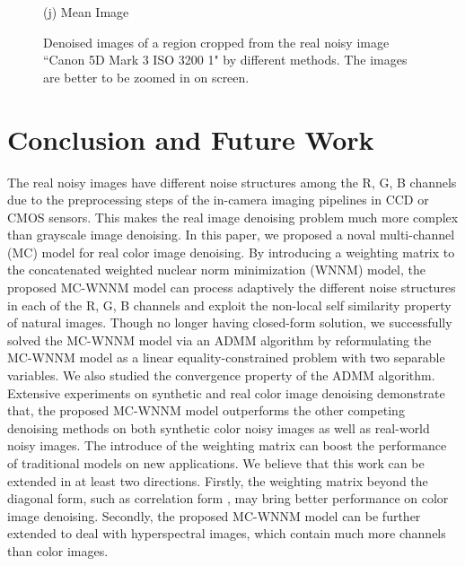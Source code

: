 \documentclass[10pt,twocolumn,letterpaper,sort&compress]{article}
\begin{document}
\begin{figure}
{\begin{minipage}[t]{0.195\textwidth}
{\footnotesize (j) Mean Image \cite{crosschannel2016}}
\end{minipage}
}\vspace{-0.5mm}
\caption{Denoised images of a region cropped from the real noisy image ``Canon 5D Mark 3 ISO 3200 1" \cite{crosschannel2016} by different methods. The images are better to be zoomed in on screen.}
\label{f5}
\vspace{0.5mm}
\end{figure}

\section{Conclusion and Future Work}

The real noisy images have different noise structures among the R, G, B channels due to the preprocessing steps of the in-camera imaging pipelines in CCD or CMOS sensors. This makes the real image denoising problem much more complex than grayscale image denoising. In this paper, we proposed a noval multi-channel (MC) model for real color image denoising. By introducing a weighting matrix to the concatenated weighted nuclear norm minimization (WNNM) model, the proposed MC-WNNM model can process adaptively the different noise structures in each of the R, G, B channels and exploit the non-local self similarity property of natural images. Though no longer having closed-form solution, we successfully solved the MC-WNNM model via an ADMM algorithm by reformulating the MC-WNNM model as a linear equality-constrained problem with two separable variables. We also studied the convergence property of the ADMM algorithm. Extensive experiments on synthetic and real color image denoising demonstrate that, the proposed MC-WNNM model outperforms the other competing denoising methods on both synthetic color noisy images as well as real-world noisy images. The introduce of the weighting matrix can boost the performance of traditional models on new applications. We believe that this work can be extended in at least two directions. Firstly, the weighting matrix beyond the diagonal form, such as correlation form \cite{nearcor}, may bring better performance on color image denoising. Secondly, the proposed MC-WNNM model can be further extended to deal with hyperspectral images, which contain much more channels than color images.



{
\small


}
\end{document}
